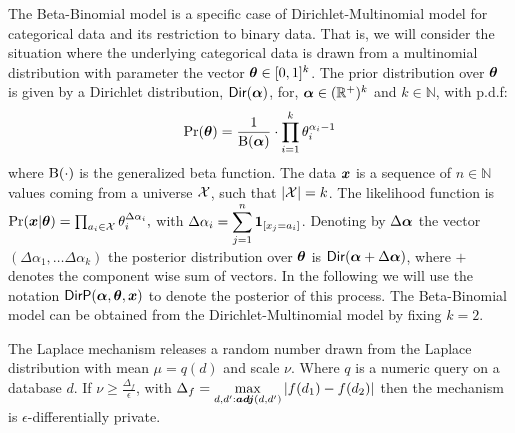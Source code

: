 \documentclass{article}
\begin{document}
\begin{defn}
The Beta-Binomial model is a specific case of Dirichlet-Multinomial model for
categorical data and its restriction to binary data.
That is, we will consider the situation where 
the underlying categorical data is drawn from a multinomial
distribution with parameter the vector $\boldsymbol{\theta}\in [0,1]^{k}$. The prior distribution over $\boldsymbol{\theta}$
is given by a Dirichlet distribution, $\mathsf{Dir}(\boldsymbol{\alpha})$, for,
$\boldsymbol{\alpha}\in(\mathbb{R}^{+})^{k}$ and $k\in\mathbb{N}$, with p.d.f:
\[
\Pr(\boldsymbol{\theta})=\frac{1}{\boldsymbol{\textup{B}}(\boldsymbol{\alpha})}\cdot\prod_{i=1}^{k}{\theta_i^{\alpha_i-1}}
\]
where $\boldsymbol{\textup{B}}(\cdot)$ is the generalized beta function.
The data $\boldsymbol{x}$ is a sequence of $n\in\mathbb{N}$ values
coming from a universe $\mathcal{X}$, such that $|\mathcal{X}|=k$.
The likelihood function is
$
\Pr(\boldsymbol{x}|\boldsymbol{\theta})=\prod_{a_i\in\mathcal{X}}\theta_{i}^{\Delta \alpha_i},
$
with $\Delta \alpha_i=\displaystyle\sum_{j=1}^{n}\mathbf{1}_{[x_j=a_i]}$.
Denoting by $\Delta\boldsymbol{\alpha}$ the vector $(\Delta\alpha_1,\dots
\Delta\alpha_k)$ the posterior distribution over $\boldsymbol{\theta}$ is
$\mathsf{Dir}(\boldsymbol{\alpha} + \Delta \boldsymbol{\alpha})$, where $+$ denotes the component wise sum of vectors.
In the following we will use the notation $\mathsf{DirP}(\boldsymbol{\alpha},\boldsymbol{\theta},
\boldsymbol{x})$ to denote the posterior of this process.
The Beta-Binomial model can be obtained from the Dirichlet-Multinomial
model by fixing $k=2$. 
\end{defn}


\begin{defn}
The Laplace mechanism releases a random number drawn from the Laplace distribution with
mean $\mu=q(d)$ and scale $\nu$. Where $q$ is a numeric query on a database $d$.
If $\nu\geq \frac{\Delta_f}{\epsilon}$, with $\Delta_f=\displaystyle\max_{d,d':\boldsymbol{adj}(d,d')}{\lvert f(d_1)-f(d_2)\lvert}$
then the mechanism is $\epsilon$-differentially private.
\end{defn}
\end{document}
